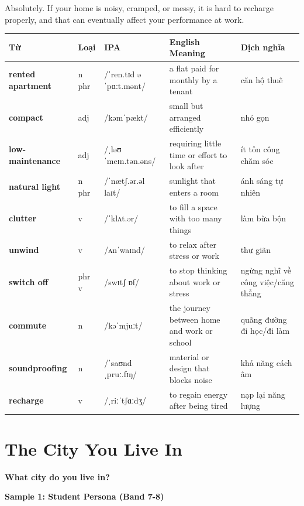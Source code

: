 Absolutely. If your home is noisy, cramped, or messy, it is hard to recharge properly, and that can eventually affect your performance at work.

\separator


\vspace{0.8em}
\begin{center}
\renewcommand{\arraystretch}{1.65}
\begin{tabularx}{\textwidth}{|V{0.22\textwidth}|C{0.07\textwidth}|I{0.20\textwidth}|Y|V{0.18\textwidth}|}
\hline
{}
\textbf{Từ} & \textbf{Loại} & \textbf{IPA} & \textbf{English Meaning} & \textbf{Dịch nghĩa} \\
\hline
\textbf{rented apartment} & n phr & /ˈren.tɪd əˈpɑːt.mənt/ & a flat paid for monthly by a tenant & căn hộ thuê \\ \hline
\textbf{compact} & adj & /kəmˈpækt/ & small but arranged efficiently & nhỏ gọn \\ \hline
\textbf{low-maintenance} & adj & /ˌləʊ ˈmeɪn.tən.əns/ & requiring little time or effort to look after & ít tốn công chăm sóc \\ \hline
\textbf{natural light} & n phr & /ˈnætʃ.ər.əl laɪt/ & sunlight that enters a room & ánh sáng tự nhiên \\ \hline
\textbf{clutter} & v & /ˈklʌt.ər/ & to fill a space with too many things & làm bừa bộn \\ \hline
\textbf{unwind} & v & /ʌnˈwaɪnd/ & to relax after stress or work & thư giãn \\ \hline
\textbf{switch off} & phr v & /swɪtʃ ɒf/ & to stop thinking about work or stress & ngừng nghĩ về công việc/căng thẳng \\ \hline
\textbf{commute} & n & /kəˈmjuːt/ & the journey between home and work or school & quãng đường đi học/đi làm \\ \hline
\textbf{soundproofing} & n & /ˈsaʊndˌpruː.fɪŋ/ & material or design that blocks noise & khả năng cách âm \\ \hline
\textbf{recharge} & v & /ˌriːˈtʃɑːdʒ/ & to regain energy after being tired & nạp lại năng lượng \\ \hline
\end{tabularx}
\end{center}

\newpage

\section{The City You Live In}
\begin{ieltsquestion}
\textbf{What city do you live in?}
\end{ieltsquestion}
\textbf{Sample 1: Student Persona (Band 7-8)}

